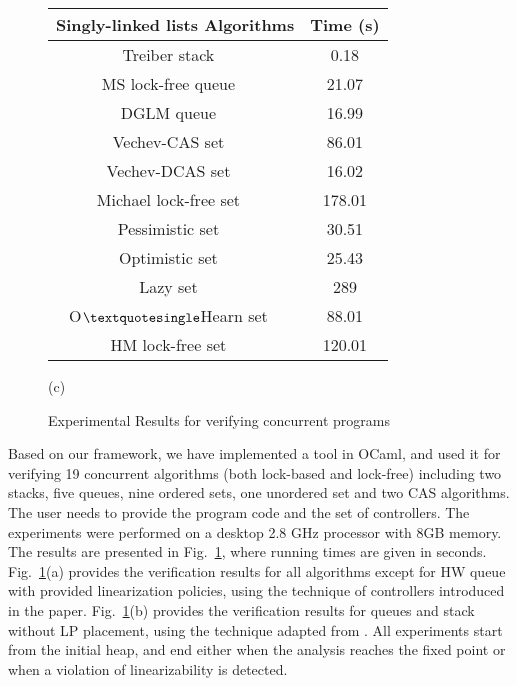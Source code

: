 \begin{figure}[]
\begin{tabular}{|c | c | }
  \hline
   \textsf{\textbf{{Singly-linked lists Algorithms}}} &  \textsf{\textbf{{Time (s)}}} \\
\hline
\textsf{Treiber stack  ~\cite{Treiber:stack}}\;\;\;\;\;\; & \textsf {0.18} \\
\hline
\textsf{MS lock-free queue  ~\cite{MS:QueueAlgorithms}}& \textsf{21.07} \\
\hline
\textsf{DGLM queue  ~\cite{Doherty:lockfree}}&  \textsf {16.99} \\
\hline
\textsf{Vechev-CAS set  ~\cite{Vechev:list}}  & \textsf{86.01} \\
\hline
\textsf{Vechev-DCAS set  ~\cite{Vechev:list}}   & \textsf{16.02}  \\
\hline
\textsf{Michael lock-free set ~\cite{Michael:list}}  & \textsf{178.01}  \\
\hline
\textsf{Pessimistic set  ~\cite{ArtOfMpP}}&\textsf{30.51} \\
\hline
\textsf{Optimistic set ~\cite{ArtOfMpP}}& \textsf{25.43} \\
\hline
\textsf{Lazy set ~\cite{Lazyset}  }  & \textsf {289} \\
\hline
\textsf {O$\textquotesingle $Hearn set  ~\cite{OHearnlist}}     & \textsf{88.01} \\
\hline
\textsf{HM lock-free set  ~\cite{ArtOfMpP} } & \textsf{120.01} \\
\hline
\end{tabular}


\vspace*{0.1cm}

(c)
\\
\caption{Experimental Results for verifying concurrent programs}
\label{Experiments:fig}
\end{figure}
Based on our framework, we have implemented a tool in OCaml, and used
it for
verifying 19 concurrent algorithms (both lock-based and lock-free)
including two stacks, 
five queues, nine ordered sets, one unordered set and two CAS algorithms. 
%
The user needs to provide the program code and the 
set of controllers.
%
The experiments were performed on a desktop 2.8 GHz processor with 8GB memory.
The results are presented in Fig.~\ref{Experiments:fig},
where running times are given in seconds. 
Fig.~\ref{Experiments:fig}(a) provides the verification
results for all algorithms except for HW queue with provided 
linearization policies, using the technique of controllers introduced in 
the paper. Fig.~\ref{Experiments:fig}(b) provides the verification
results for queues and stack without LP placement, using the technique 
adapted from \cite{BEEH:icalp15,HSV:concur13}.
%
All experiments start from the initial heap,  
and end either when the analysis 
reaches the fixed point or when a violation of linearizability is detected. 

